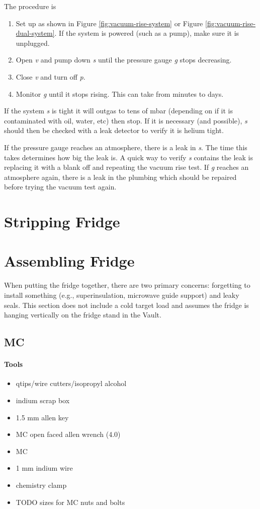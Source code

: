 The procedure is
\begin{enumerate}
 \item Set up as shown in Figure \ref{fig:vacuum-rise-system} or Figure \ref{fig:vacuum-rise-dual-system}.  If the system is powered (such as a pump), make sure it is unplugged.
 \item Open \textit{v} and pump down \textit{s} until the pressure gauge \textit{g} stops decreasing.
 \item Close \textit{v} and turn off \textit{p}.
 \item Monitor \textit{g} until it stops rising.  This can take from minutes to days.
\end{enumerate}

If the system \textit{s} is tight it will outgas to tens of mbar (depending on if it is contaminated with oil, water, etc) then stop.  If it is necessary (and possible), \textit{s} should then be checked with a leak detector to verify it is helium tight.

If the pressure gauge reaches an atmosphere, there is a leak in \textit{s}.  The time this takes determines how big the leak is.  A quick way to verify \textit{s} contains the leak is replacing it with a blank off and repeating the vacuum rise test.  If \textit{g} reaches an atmosphere again, there is a leak in the plumbing which should be repaired before trying the vacuum test again.

\section{Stripping Fridge}

\section{Assembling Fridge}

When putting the fridge together, there are two primary concerns: forgetting to install something (e.g., superinsulation, microwave guide support) and leaky seals.  This section does not include a cold target load and assumes the fridge is hanging vertically on the fridge stand in the Vault.

\subsection{MC}
\paragraph{Tools}
\begin{itemize}
 \item qtips/wire cutters/isopropyl alcohol
\item indium scrap box
\item 1.5 mm allen key
\item MC open faced allen wrench (4.0)
\item MC
\item 1 mm indium wire
\item chemistry clamp
\item TODO sizes for MC nuts and bolts
\end{itemize}

